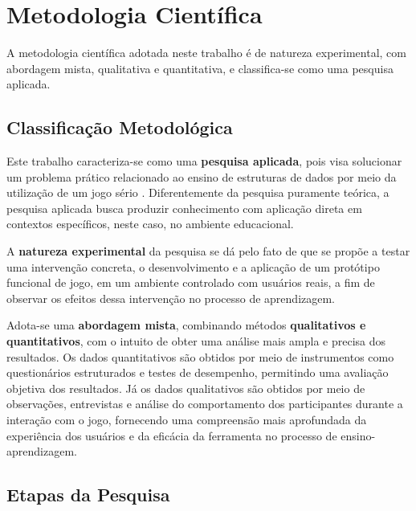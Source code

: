 \section{Metodologia Científica}

A metodologia científica adotada neste trabalho é de natureza experimental, com abordagem mista, qualitativa e quantitativa, e classifica-se como uma pesquisa aplicada. 

\subsection{Classificação Metodológica}

Este trabalho caracteriza-se como uma \textbf{pesquisa aplicada}, pois visa solucionar um problema prático relacionado ao ensino de estruturas de dados por meio da utilização de um jogo sério \cite{mouaheb2012serious}. Diferentemente da pesquisa puramente teórica, a pesquisa aplicada busca produzir conhecimento com aplicação direta em contextos específicos, neste caso, no ambiente educacional.

A \textbf{natureza experimental} da pesquisa se dá pelo fato de que se propõe a testar uma intervenção concreta, o desenvolvimento e a aplicação de um protótipo funcional de jogo, em um ambiente controlado com usuários reais, a fim de observar os efeitos dessa intervenção no processo de aprendizagem.

Adota-se uma \textbf{abordagem mista}, combinando métodos \textbf{qualitativos e quantitativos}, com o intuito de obter uma análise mais ampla e precisa dos resultados. Os dados quantitativos são obtidos por meio de instrumentos como questionários estruturados e testes de desempenho, permitindo uma avaliação objetiva dos resultados. Já os dados qualitativos são obtidos por meio de observações, entrevistas e análise do comportamento dos participantes durante a interação com o jogo, fornecendo uma compreensão mais aprofundada da experiência dos usuários e da eficácia da ferramenta no processo de ensino-aprendizagem.

\subsection{Etapas da Pesquisa}


